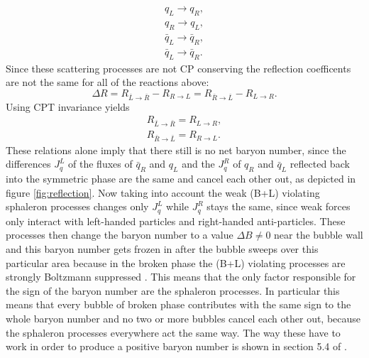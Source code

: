 \begin{align*}
	q_L\rightarrow q_R,\\
	q_R\rightarrow q_L,\\
	\bar{q}_L\rightarrow \bar{q}_R,\\
	\bar{q}_L\rightarrow \bar{q}_R.
\end{align*}
Since these scattering processes are not CP conserving the reflection coefficents are not the same for all of the reactions above:
\begin{equation}
	\Delta R=R_{\bar{L}\rightarrow\bar{R}}-R_{R\rightarrow L}=R_{\bar{R}\rightarrow\bar{L}}-R_{L\rightarrow R}.
	\label{eq:reflection_coeff}
\end{equation}
Using CPT invariance yields
\begin{align}
	R_{\bar{L}\rightarrow\bar{R}}=R_{L\rightarrow R},\\
	R_{\bar{R}\rightarrow\bar{L}}=R_{R\rightarrow L}.
\end{align}
These relations alone imply that there still is no net baryon number, since the differences $J^L_q$ of the fluxes of $\bar{q}_R$ and $q_L$ and the  $J^R_q$ of $q_R$ and $\bar{q}_L$ reflected back into the symmetric phase are the same and cancel each other out, as depicted in figure \ref{fig:reflection}. Now taking into account the weak (B+L) violating sphaleron processes changes only $J^L_q$ while  $J^R_q$ stays the same, since weak forces only interact with left-handed particles and right-handed anti-particles. These processes then change the baryon number to a value $\Delta B\neq$0 near the bubble wall and this baryon number gets frozen in after the bubble sweeps over this particular area because in the broken phase the (B+L) violating processes are strongly Boltzmann suppressed \cite{Bernreuther:2002uj}. This means that the only factor responsible for the sign of the baryon number are the sphaleron processes. In particular this means that every bubble of broken phase contributes with the same sign to the whole baryon number and no two or more bubbles cancel each other out, because the sphaleron processes everywhere act the same way. The way these have to work in order to produce a positive baryon number is shown in section 5.4 of \cite{Bernreuther:2002uj}.
